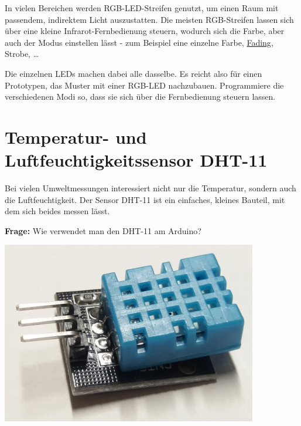 \begin{projekt}\label{proj:fernsteuerung-rgb}
	In vielen Bereichen werden RGB-LED-Streifen genutzt, um einen Raum mit passendem, indirektem Licht auszustatten. Die meisten RGB-Streifen lassen sich über eine kleine Infrarot-Fernbedienung steuern, wodurch sich die Farbe, aber auch der Modus einstellen lässt - zum Beispiel eine einzelne Farbe, \hyperref[sec:pwm]{Fading}, Strobe, \dots
	
	Die einzelnen LEDs machen dabei alle dasselbe. Es reicht also für einen Prototypen, das Muster mit einer RGB-LED nachzubauen. Programmiere die verschiedenen Modi so, dass sie sich über die Fernbedienung steuern lassen.
\end{projekt}

\newpage
\section{Temperatur- und Luftfeuchtigkeitssensor DHT-11}
\label{sec:templuft}
\setcounter{aufgabennummer}{0}
\setcounter{projektnummer}{0}

\begin{minipage}{0.7\textwidth}
	Bei vielen Umweltmessungen interessiert nicht nur die Temperatur, sondern auch die Luftfeuchtigkeit. Der Sensor DHT-11 ist ein einfaches, kleines Bauteil, mit dem sich beides messen lässt.
	
	\begin{ziel}
		\textbf{Frage:} Wie verwendet man den DHT-11 am Arduino?
	\end{ziel}
\end{minipage}
\hfill
\begin{minipage}{0.25\textwidth}
	\centering
	\includegraphics[width=0.84\textwidth]{./pics/dht11.jpg}
\end{minipage}
\medskip


